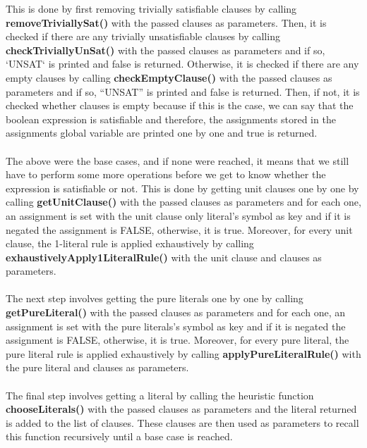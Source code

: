 \documentclass{article}
\newcommand{\quotes}[1]{``#1''}
\begin{document}
\begin{enumerate}
		This is done by first removing trivially satisfiable clauses by calling \textbf{removeTriviallySat()} with the passed clauses as parameters. Then, it is checked if there are any trivially unsatisfiable clauses by calling \textbf{checkTriviallyUnSat()} with the passed clauses as parameters and if so, `UNSAT` is printed and false is returned.
		Otherwise, it is checked if there are any empty clauses by calling \textbf{checkEmptyClause()} with the passed clauses as parameters and if so, \quotes{UNSAT} is printed and false is returned.
		Then, if not, it is checked whether clauses is empty because if this is the case, we can say that the boolean expression is satisfiable and therefore, the assignments stored in the assignments global variable are printed one by one and true is returned.\\\\
		The above were the base cases, and if none were reached, it means that we still have to perform some more operations before we get to know whether the expression is satisfiable or not. This is done by getting unit clauses one by one by calling \textbf{getUnitClause()} with the passed clauses as parameters and for each one, an assignment is set with the unit clause only literal's symbol as key and if it is negated the assignment is FALSE, otherwise, it is true. Moreover, for every unit clause, the 1-literal rule is applied exhaustively by calling \textbf{exhaustivelyApply1LiteralRule()} with the unit clause and clauses as parameters. \\\\
		The next step involves getting the pure literals one by one by calling \textbf{getPureLiteral()} with the passed clauses as parameters and for each one, an assignment is set with the pure literals's symbol as key and if it is negated the assignment is FALSE, otherwise, it is true. Moreover, for every pure literal, the pure literal rule is applied exhaustively by calling \textbf{applyPureLiteralRule()} with the pure literal and clauses as parameters. \\\\ 
		The final step involves getting a literal by calling the heuristic function \textbf{chooseLiterals()} with the passed clauses as parameters and the literal returned is added to the list of clauses. These clauses are then used as parameters to recall this function recursively until a base case is reached.
		
						
		\end{enumerate}					
		
\end{document}
